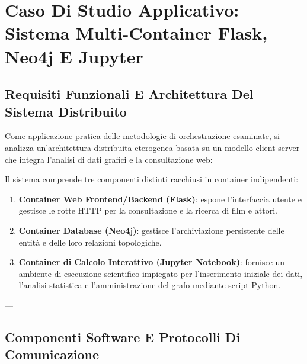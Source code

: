 \documentclass[11pt, a4paper]{article}
\begin{document}
\newpage


\section{Caso Di Studio Applicativo: Sistema Multi-Container Flask, Neo4j E Jupyter}

\subsection{Requisiti Funzionali E Architettura Del Sistema Distribuito}

Come applicazione pratica delle metodologie di orchestrazione esaminate, si analizza un'architettura distribuita eterogenea basata su un modello client-server che integra l'analisi di dati grafici e la consultazione web:


Il sistema comprende tre componenti distinti racchiusi in container indipendenti:
\begin{enumerate}
    \item \textbf{Container Web Frontend/Backend (Flask)}: espone l'interfaccia utente e gestisce le rotte HTTP per la consultazione e la ricerca di film e attori.
    \item \textbf{Container Database (Neo4j)}: gestisce l'archiviazione persistente delle entità e delle loro relazioni topologiche.
    \item \textbf{Container di Calcolo Interattivo (Jupyter Notebook)}: fornisce un ambiente di esecuzione scientifico impiegato per l'inserimento iniziale dei dati, l'analisi statistica e l'amministrazione del grafo mediante script Python.
\end{enumerate}

---

\subsection{Componenti Software E Protocolli Di Comunicazione}
\end{document}
